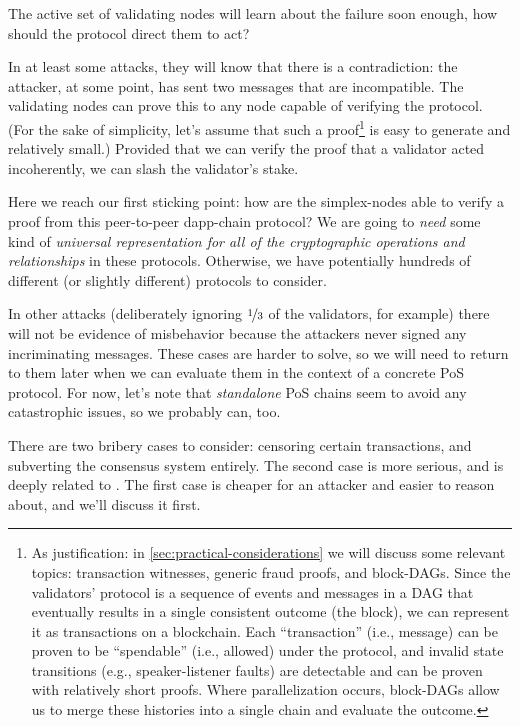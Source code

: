 The active set of validating nodes will learn about the failure soon enough, how should the protocol direct them to act?

In at least some attacks, they will know that there is a contradiction:
the attacker, at some point, has sent two messages that are incompatible.
The validating nodes can prove this to any node capable of verifying the protocol.
(For the sake of simplicity, let's assume that such a proof\footnote{
    As justification: in \autoref{sec:practical-considerations} we will discuss some relevant topics: transaction witnesses, generic fraud proofs, and block-DAGs.
    Since the validators' protocol is a sequence of events and messages in a DAG that eventually results in a single consistent outcome (the block), we can represent it as transactions on a blockchain.
    Each ``transaction'' (i.e., message) can be proven to be ``spendable'' (i.e., allowed) under the protocol, and invalid state transitions (e.g., speaker-listener faults) are detectable and can be proven with relatively short proofs.
    Where parallelization occurs, block-DAGs allow us to merge these histories into a single chain and evaluate the outcome.
} is easy to generate and relatively small.)
Provided that we can verify the proof that a validator acted incoherently, we can slash the validator's stake.

Here we reach our first sticking point: how are the simplex-nodes able to verify a proof from this peer-to-peer dapp-chain protocol?
We are going to \emph{need} some kind of \emph{universal representation for all of the cryptographic operations and relationships} in these protocols.
Otherwise, we have potentially hundreds of different (or slightly different) protocols to consider.

In other attacks (deliberately ignoring $\nicefrac{1}{3}$ of the validators, for example) there will not be evidence of misbehavior because the attackers never signed any incriminating messages.
These cases are harder to solve, so we will need to return to them later when we can evaluate them in the context of a concrete PoS protocol. %
For now, let's note that \emph{standalone} PoS chains seem to avoid any catastrophic issues, so we probably can, too.


There are two bribery cases to consider: censoring certain transactions, and subverting the consensus system entirely.
The second case is more serious, and is deeply related to \thePpeProblem.
The first case is cheaper for an attacker and easier to reason about, and we'll discuss it first.

